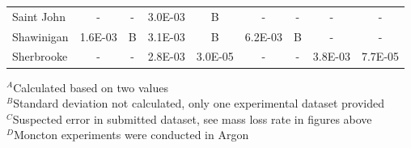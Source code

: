 \documentclass{book}
\begin{document}
\begin{table}[ht]
\begin{center}
\begin{tabular}{|l|cc|cc|cc|cc|}
Saint John              & -           & -               & 3.0E-03        & B                & -          & -                 & -           & -                     \\
Shawinigan              & 1.6E-03     & B               & 3.1E-03        & B                & 6.2E-03    & B                 & -           & -                     \\
Sherbrooke              & -           & -               & 2.8E-03        & 3.0E-05          & -          & -                 & 3.8E-03     & 7.7E-05               \\  \hline
\end{tabular}
\end{center}
$^A$Calculated based on two values \\
$^B$Standard deviation not calculated, only one experimental dataset provided \\
$^C$Suspected error in submitted dataset, see mass loss rate in figures above\\
$^D$Moncton experiments were conducted in Argon
\end{table}
\end{document}
